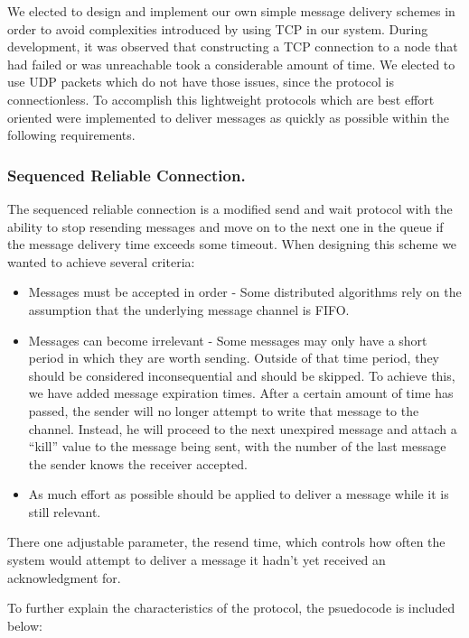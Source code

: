 We elected to design and implement our own simple message delivery schemes in 
order to avoid complexities introduced by using TCP in our system. During 
development, it was observed that constructing a TCP connection to a node that 
had 
failed or was unreachable took a considerable amount of time. We elected to use 
UDP packets which do not have those issues, since the protocol is 
connectionless. To accomplish this lightweight protocols which are best effort 
oriented were implemented to deliver messages as quickly as possible within
the following requirements.

\subsubsection{Sequenced Reliable Connection.}

The sequenced reliable connection is a modified send and wait protocol with the 
ability to stop resending messages and move on to the next one in the queue if 
the message delivery time exceeds some timeout. When designing this scheme we
wanted to achieve several criteria:

\begin{itemize}
\item Messages must be accepted in order - Some distributed algorithms rely on 
the assumption that the underlying message channel is FIFO.
\item Messages can become irrelevant - Some messages may only have a short 
period in which they are worth sending. Outside of that time period, they 
should be considered inconsequential and should be skipped. To achieve this, we 
have added message expiration times. After a certain amount of time has passed, 
the sender will no longer attempt to write that message to the channel. 
Instead, he will proceed to the next unexpired message and attach a ``kill'' 
value to the message being sent, with the number of the last message the sender 
knows the receiver accepted.
\item As much effort as possible should be applied to deliver a message while 
it is still relevant.
\end{itemize}

There one adjustable parameter, the resend time, which controls how often the 
system would attempt to deliver a message it hadn't yet received an 
acknowledgment for.

To further explain the characteristics of the protocol, the psuedocode is 
included below:


